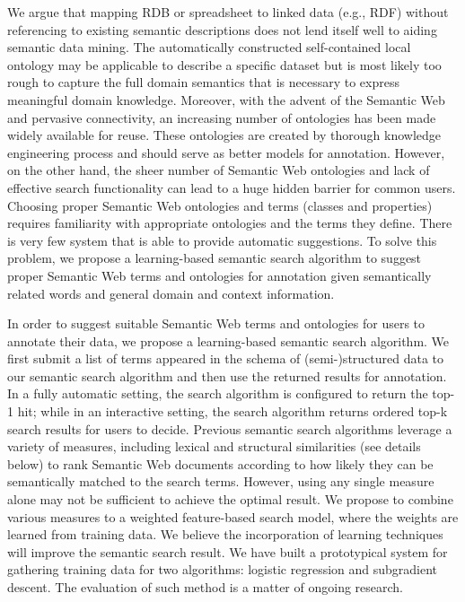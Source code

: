 We argue that mapping RDB or spreadsheet to linked data (e.g., RDF) without referencing to existing semantic descriptions does not lend itself well to aiding semantic data mining. The automatically constructed self-contained local ontology may be applicable to describe a specific dataset but is most likely too rough to capture the full domain semantics that is necessary to express meaningful domain knowledge. Moreover, with the advent of the Semantic Web and pervasive connectivity, an increasing number of ontologies has been made widely available for reuse. These ontologies are created by thorough knowledge engineering process and should serve as better models for annotation. However, on the other hand, the sheer number of Semantic Web ontologies and lack of effective search functionality can lead to a huge hidden barrier for common users. Choosing proper Semantic Web ontologies and terms (classes and properties) requires familiarity with appropriate ontologies and the terms they define. There is very few system that is able to provide automatic suggestions. To solve this problem, we propose a learning-based semantic search algorithm to suggest proper Semantic Web terms and ontologies for annotation given semantically related words and general domain and context information.

In order to suggest suitable Semantic Web terms and ontologies for users to annotate their data, we propose a learning-based semantic search algorithm. We first submit a list of terms appeared in the schema of (semi-)structured data to our semantic search algorithm and then use the returned results for annotation. In a fully automatic setting, the search algorithm is configured to return the top-1 hit; while in an interactive setting, the search algorithm returns ordered top-k search results for users to decide. Previous semantic search algorithms leverage a variety of measures, including lexical and structural similarities (see details below) to rank Semantic Web documents according to how likely they can be semantically matched to the search terms. However, using any single measure alone may not be sufficient to achieve the optimal result. We propose to combine various measures to a weighted feature-based search model, where the weights are learned from training data. We believe the incorporation of learning techniques will improve the semantic search result. We have built a prototypical system for gathering training data for two algorithms: logistic regression and subgradient descent. The evaluation of such method is a matter of ongoing research.


